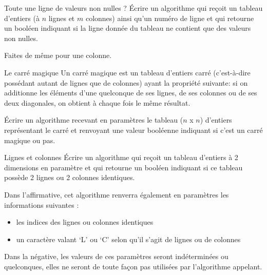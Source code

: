 	\begin{Exercice}{Toute une ligne de valeurs non nulles ?}
		Écrire un algorithme qui reçoit un tableau d'entiers
		(à $n$ lignes et $m$ colonnes)
		ainsi qu'un numéro de ligne
		et qui retourne un booléen indiquant si la ligne donnée du tableau
		ne contient que des valeurs non nulles.
		
		\begin{algo}
			\;
		\end{algo}
		
		Faites de même pour une colonne.
	\end{Exercice}

	\begin{Exercice}{Le carré magique}
		Un carré magique est un tableau d’entiers carré
		(c'est-à-dire possédant autant de lignes que de
		colonnes) ayant la propriété suivante: si on additionne les éléments
		d'une quelconque de ses lignes, de ses colonnes ou de
		ses deux diagonales, on obtient à chaque fois le même résultat.
		
		Écrire un algorithme recevant en paramètres le tableau ($n$ x $n$)
		d'entiers représentant le carré et renvoyant une valeur booléenne
		indiquant si c'est un carré magique ou pas.
	\end{Exercice}
			
	\begin{Exercice}{Lignes et colonnes}
		Écrire un algorithme qui reçoit un tableau d’entiers à 2 dimensions en paramètre 
		et qui retourne un booléen indiquant si ce tableau 
		possède 2 lignes ou 2 colonnes identiques.
		
		Dans l’affirmative, 
		cet algorithme renverra également en paramètres les informations suivantes :
		\begin{itemize}
		\item les indices des lignes ou colonnes identiques
		\item un caractère valant ‘L’ ou ‘C’ selon qu’il s’agit de lignes ou de
		colonnes
		\end{itemize}
		
		Dans la négative, les valeurs de ces paramètres seront indéterminées ou
		quelconques, elles ne seront de toute façon pas utilisées par l'algorithme
		appelant.
	\end{Exercice}
	
